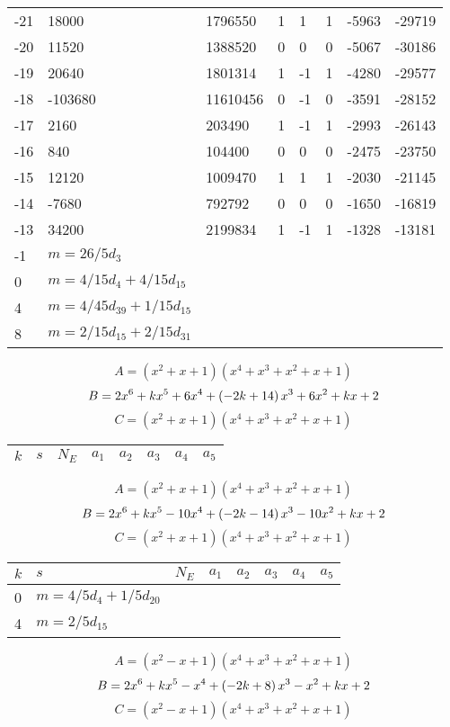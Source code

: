 \documentclass{amsart}
\begin{document}
\begin{longtable}{|l|l|l|lllll|}
-21&18000&1796550&1&1&1&-5963&-29719\\
-20&11520&1388520&0&0&0&-5067&-30186\\
-19&20640&1801314&1&-1&1&-4280&-29577\\
-18&-103680&11610456&0&-1&0&-3591&-28152\\
-17&2160&203490&1&-1&1&-2993&-26143\\
-16&840&104400&0&0&0&-2475&-23750\\
-15&12120&1009470&1&1&1&-2030&-21145\\
-14&-7680&792792&0&0&0&-1650&-16819\\
-13&34200&2199834&1&-1&1&-1328&-13181\\
-1&$m=26/5d_{3}$&&\multicolumn{5}{c|}{}\\
0&$m=4/15d_{4}+4/15d_{15}$&&\multicolumn{5}{c|}{}\\
4&$m=4/45d_{39}+1/15d_{15}$&&\multicolumn{5}{c|}{}\\
8&$m=2/15d_{15}+2/15d_{31}$&&\multicolumn{5}{c|}{}\\
\hline
\end{longtable}
$$A=(x^2
 + x
 + 1)(x^4
 + x^3
 + x^2
 + x
 + 1)$$
$$B=2\*x^6
 + k\*x^5
 + 6\*x^4
 + \left(-2\*k
 + 14\right) \*x^3
 + 6\*x^2
 + k\*x
 + 2$$
$$C=(x^2
 + x
 + 1)(x^4
 + x^3
 + x^2
 + x
 + 1)$$
\begin{longtable}{|l|l|l|lllll|}
\hline
$k$ & $s$ & $N_E$ & $a_1$ & $a_2$ & $a_3$ & $a_4$ & $a_5$\\
\hline
\hline
\end{longtable}
$$A=(x^2
 + x
 + 1)(x^4
 + x^3
 + x^2
 + x
 + 1)$$
$$B=2\*x^6
 + k\*x^5
 - 10\*x^4
 + \left(-2\*k
 - 14\right) \*x^3
 - 10\*x^2
 + k\*x
 + 2$$
$$C=(x^2
 + x
 + 1)(x^4
 + x^3
 + x^2
 + x
 + 1)$$
\begin{longtable}{|l|l|l|lllll|}
\hline
$k$ & $s$ & $N_E$ & $a_1$ & $a_2$ & $a_3$ & $a_4$ & $a_5$\\
\hline
0&$m=4/5d_{4}+1/5d_{20}$&&\multicolumn{5}{c|}{}\\
4&$m=2/5d_{15}$&&\multicolumn{5}{c|}{}\\
\hline
\end{longtable}
$$A=(x^2
 - x
 + 1)(x^4
 + x^3
 + x^2
 + x
 + 1)$$
$$B=2\*x^6
 + k\*x^5
 - x^4
 + \left(-2\*k
 + 8\right) \*x^3
 - x^2
 + k\*x
 + 2$$
$$C=(x^2
 - x
 + 1)(x^4
 + x^3
 + x^2
 + x
 + 1)$$
\end{document}
